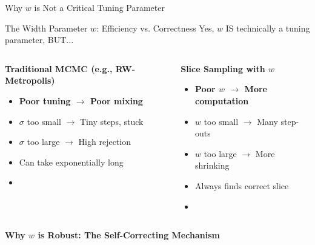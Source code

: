\documentclass[aspectratio=169]{beamer}
\begin{document}
\begin{frame}{Why $w$ is Not a Critical Tuning Parameter}

	\begin{block}{The Width Parameter $w$: Efficiency vs. Correctness}
		Yes, $w$ IS technically a tuning parameter, BUT...
	\end{block}

	\begin{columns}[T]
		\begin{column}{0.48\textwidth}
			\textbf{Traditional MCMC (e.g., RW-Metropolis)}
			\begin{itemize}
				\item \textbf{Poor tuning $\rightarrow$ Poor mixing}
				\item $\sigma$ too small $\rightarrow$ Tiny steps, stuck
				\item $\sigma$ too large $\rightarrow$ High rejection
				\item Can take exponentially long
				\item {}
			\end{itemize}
		\end{column}
		\begin{column}{0.48\textwidth}
			\textbf{Slice Sampling with $w$}
			\begin{itemize}
				\item \textbf{Poor $w$ $\rightarrow$ More computation}
				\item $w$ too small $\rightarrow$ Many step-outs
				\item $w$ too large $\rightarrow$ More shrinking
				\item Always finds correct slice
				\item {}
			\end{itemize}
		\end{column}
	\end{columns}

	\vspace{0.3cm}
	\textbf{Why $w$ is Robust: The Self-Correcting Mechanism}


\end{frame}
\end{document}
